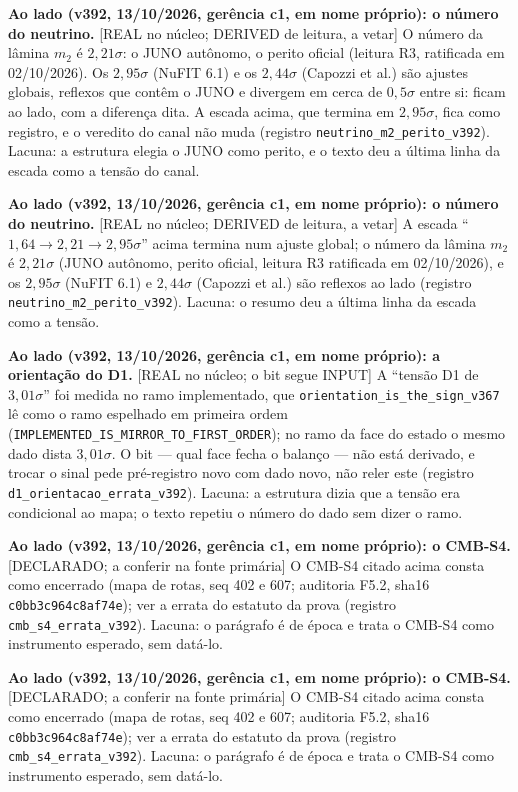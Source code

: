 \documentclass[11pt]{article}
\theoremstyle{definition}\newtheorem{deriv}{Derivação}
\begin{document}
\textbf{Ao lado (v392, 13/10/2026, gerência c1, em nome próprio): o número do neutrino.} \textsf{[REAL no núcleo; DERIVED de leitura, a vetar]} O número da lâmina $m_2$ é $2{,}21\sigma$: o JUNO autônomo, o perito oficial (leitura R3, ratificada em 02/10/2026). Os $2{,}95\sigma$ (NuFIT 6.1) e os $2{,}44\sigma$ (Capozzi et al.) são ajustes globais, reflexos que contêm o JUNO e divergem em cerca de $0{,}5\sigma$ entre si: ficam ao lado, com a diferença dita. A escada acima, que termina em $2{,}95\sigma$, fica como registro, e o veredito do canal não muda (registro \texttt{neutrino\_m2\_perito\_v392}). Lacuna: a estrutura elegia o JUNO como perito, e o texto deu a última linha da escada como a tensão do canal.

\textbf{Ao lado (v392, 13/10/2026, gerência c1, em nome próprio): o número do neutrino.} \textsf{[REAL no núcleo; DERIVED de leitura, a vetar]} A escada ``$1{,}64\to2{,}21\to2{,}95\sigma$'' acima termina num ajuste global; o número da lâmina $m_2$ é $2{,}21\sigma$ (JUNO autônomo, perito oficial, leitura R3 ratificada em 02/10/2026), e os $2{,}95\sigma$ (NuFIT 6.1) e $2{,}44\sigma$ (Capozzi et al.) são reflexos ao lado (registro \texttt{neutrino\_m2\_perito\_v392}). Lacuna: o resumo deu a última linha da escada como a tensão.

\textbf{Ao lado (v392, 13/10/2026, gerência c1, em nome próprio): a orientação do D1.} \textsf{[REAL no núcleo; o bit segue INPUT]} A ``tensão D1 de $3{,}01\sigma$'' foi medida no ramo implementado, que \texttt{orientation\_is\_the\_sign\_v367} lê como o ramo espelhado em primeira ordem (\texttt{IMPLEMENTED\_IS\_MIRROR\_TO\_FIRST\_ORDER}); no ramo da face do estado o mesmo dado dista $3{,}01\sigma$. O bit --- qual face fecha o balanço --- não está derivado, e trocar o sinal pede pré-registro novo com dado novo, não reler este (registro \texttt{d1\_orientacao\_errata\_v392}). Lacuna: a estrutura dizia que a tensão era condicional ao mapa; o texto repetiu o número do dado sem dizer o ramo.

\textbf{Ao lado (v392, 13/10/2026, gerência c1, em nome próprio): o CMB-S4.} \textsf{[DECLARADO; a conferir na fonte primária]} O CMB-S4 citado acima consta como encerrado (mapa de rotas, seq 402 e 607; auditoria F5.2, sha16 \texttt{c0bb3c964c8af74e}); ver a errata do estatuto da prova (registro \texttt{cmb\_s4\_errata\_v392}). Lacuna: o parágrafo é de época e trata o CMB-S4 como instrumento esperado, sem datá-lo.

\textbf{Ao lado (v392, 13/10/2026, gerência c1, em nome próprio): o CMB-S4.} \textsf{[DECLARADO; a conferir na fonte primária]} O CMB-S4 citado acima consta como encerrado (mapa de rotas, seq 402 e 607; auditoria F5.2, sha16 \texttt{c0bb3c964c8af74e}); ver a errata do estatuto da prova (registro \texttt{cmb\_s4\_errata\_v392}). Lacuna: o parágrafo é de época e trata o CMB-S4 como instrumento esperado, sem datá-lo.
\end{document}
